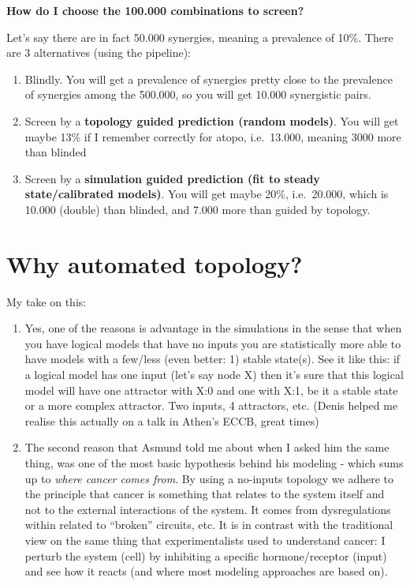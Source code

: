 \documentclass[
  12pt,
]{book}
\providecommand{\tightlist}{%
  \setlength{\itemsep}{0pt}\setlength{\parskip}{0pt}}
\begin{document}
\textbf{How do I choose the 100.000 combinations to screen?}

Let's say there are in fact 50.000 synergies, meaning a prevalence of 10\%.
There are 3 alternatives (using the pipeline):

\begin{enumerate}
\def\labelenumi{\arabic{enumi}.}
\tightlist
\item
  Blindly.
  You will get a prevalence of synergies pretty close to the prevalence of synergies among the 500.000, so you will get 10.000 synergistic pairs.
\item
  Screen by a \textbf{topology guided prediction (random models)}.
  You will get maybe 13\% if I remember correctly for atopo, i.e.~13.000, meaning 3000 more than blinded
\item
  Screen by a \textbf{simulation guided prediction (fit to steady state/calibrated models)}.
  You will get maybe 20\%, i.e.~20.000, which is 10.000 (double) than blinded, and 7.000 more than guided by topology.
\end{enumerate}

\hypertarget{why-automated-topology}{%
\section*{Why automated topology?}\label{why-automated-topology}}

My take on this:

\begin{enumerate}
\def\labelenumi{\arabic{enumi}.}
\tightlist
\item
  Yes, one of the reasons is advantage in the simulations in the sense that when you have logical models that have no inputs you are statistically more able to have models with a few/less (even better: 1) stable state(s).
  See it like this: if a logical model has one input (let's say node X) then it's sure that this logical model will have one attractor with X:0 and one with X:1, be it a stable state or a more complex attractor.
  Two inputs, 4 attractors, etc. (Denis helped me realise this actually on a talk in Athen's ECCB, great times)
\item
  The second reason that Asmund told me about when I asked him the same thing, was one of the most basic hypothesis behind his modeling - which sums up to \emph{where cancer comes from}.
  By using a no-inputs topology we adhere to the principle that cancer is something that relates to the system itself and not to the external interactions of the system.
  It comes from dysregulations within related to ``broken'' circuits, etc.
  It is in contrast with the traditional view on the same thing that experimentalists used to understand cancer: I perturb the system (cell) by inhibiting a specific hormone/receptor (input) and see how it reacts (and where most modeling approaches are based on).
\end{enumerate}
\end{document}
